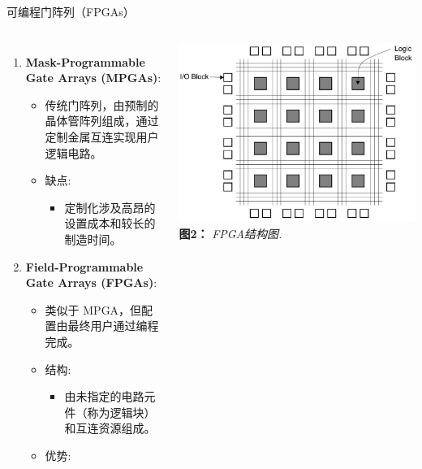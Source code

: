 \begin{frame}{可编程门阵列（FPGAs）}
\begin{columns}[T]
\begin{enumerate}
\tightlist
\item
\textbf{Mask-Programmable Gate Arrays (MPGAs)}:
\begin{itemize}
\tightlist
\item
传统门阵列，由预制的晶体管阵列组成，通过定制金属互连实现用户逻辑电路。
\item
缺点:
\begin{itemize}
\tightlist
\item
定制化涉及高昂的设置成本和较长的制造时间。
\end{itemize}
\end{itemize}
\item
\textbf{Field-Programmable Gate Arrays (FPGAs)}:
\begin{itemize}
\tightlist
\item
类似于 MPGA，但配置由最终用户通过编程完成。
\item
结构:
\begin{itemize}
\tightlist
\item
由未指定的电路元件（称为逻辑块）和互连资源组成。
\end{itemize}
\item
优势:
\end{itemize}
\end{enumerate}

\begin{center}
\includegraphics[width=\textwidth, height=0.6\textheight, keepaspectratio]{img1/FPGA.jpeg}\\
\textbf{图2：} \emph{FPGA结构图.}
\end{center}
\end{columns}
\end{frame}

